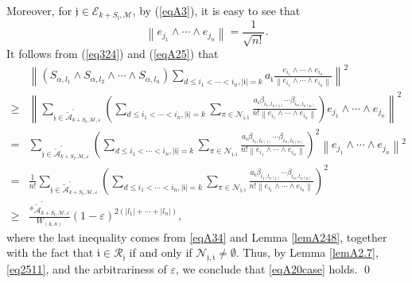 \documentclass[11pt]{article}
\theoremstyle{plain}
\theoremstyle{definition}
\begin{document}
{		Moreover, for $\mathfrak{j} \in \mathcal{E}_{k+S_{\mathfrak{l}},\mathscr{M}} $, by (\ref{eqA3}), it is easy to see that
		\begin{equation}\label{eqA25}
			\left \| e_{j_1} \wedge \cdots \wedge e_{j_n} \right \| =\frac{1}{\sqrt{n!} }.
		\end{equation}
	It follows from (\ref{eq324}) and (\ref{eqA25}) that 
		\begin{equation}\label{eq2511}  \begin{aligned}
				&	\left \| \left (S_{{\alpha,l_{1}}}\wedge S_{{\alpha,l_{2}}}\wedge \cdots \wedge S_{{\alpha,l_{n}}}  \right )
				\sum\limits_{d \leq i_1 < \cdots < i_n, |\mathfrak{i}|=k}a_{ \mathfrak{i}} \frac{ e_{i_1} \wedge \cdots \wedge e_{i_n} }{\left \|  e_{i_1} \wedge \cdots \wedge e_{i_n}  \right \| }       \right \| ^{2}
				\\\ge& \left \| \sum\limits_{\mathfrak{j}\in \tilde{\mathcal{A}}_{k+S_{\mathfrak{l}},\mathscr{M},\varepsilon }^{\prime}}
				\left ( \sum\limits_{d \leq i_1 < \cdots < i_n, |\mathfrak{i}|=k}
				\sum\limits_{\pi \in \mathcal{N}_{\mathfrak{j}, \mathfrak{i}  } } \frac{a_{ \mathfrak{i}}		\beta_{i_{1},l_{\pi  (1)}}\cdots\beta_{i_{n},l_{\pi  (n)}}}{n!\left \| e_{i_1} \wedge \cdots \wedge e_{i_n} \right \|} \right )
				e_{j_1} \wedge \cdots \wedge e_{j_n}   \right \| ^{2}
				\\= &\sum\limits_{\mathfrak{j}\in \tilde{\mathcal{A}}_{k+S_{\mathfrak{l}},\mathscr{M},\varepsilon }^{\prime}} \left( \sum\limits_{d \leq i_1 < \cdots < i_n, |\mathfrak{i}|=k}
				\sum\limits_{\pi \in \mathcal{N}_{\mathfrak{j}, \mathfrak{i}  } }\frac{a_{ \mathfrak{i}}		\beta_{i_{1},l_{\pi  (1)}} \cdots\beta_{i_{n},l_{\pi  (n)}} }{n!\left \| e_{i_1} \wedge \cdots \wedge e_{i_n} \right \|} \right ) ^{2}
				\left \| e_{j_1} \wedge \cdots \wedge e_{j_n}  \right \| ^{2}
				\\= &\frac{1}{n!}\sum\limits_{\mathfrak{j}\in \tilde{\mathcal{A}}_{k+S_{\mathfrak{l}},\mathscr{M},\varepsilon }^{\prime}}
				\left( \sum\limits_{d \leq i_1 < \cdots < i_n, |\mathfrak{i}|=k}
				\sum\limits_{\pi \in \mathcal{N}_{\mathfrak{j}, \mathfrak{i}  } }\frac{a_{ \mathfrak{i}}		\beta_{i_{1},l_{\pi  (1)}} \cdots\beta_{i_{n},l_{\pi  (n)}} }{n!\left \| e_{i_1} \wedge \cdots \wedge e_{i_n} \right \|} \right ) ^{2}\\ \ge&  \frac{^{\#  } \tilde{\mathcal{A}}_{k+S_{\mathfrak{l}},\mathscr{M},\varepsilon }^{\prime} }{W_{(k,n)} } \left ( 1 - \varepsilon \right ) ^{2\left ( \left | l_{1} \right |  + \cdots +\left | l_{n} \right | \right ) },
		\end{aligned}	\end{equation}
		where the last inequality comes from \eqref{eqA34} and Lemma \ref{lemA248}, together with the fact that $ \mathfrak{i} \in \mathcal{R}_{\mathfrak{j} }$ if and only if $\mathcal{N}_{\mathfrak{j},\mathfrak{i} }  \neq \emptyset.$
		Thus, by Lemma \ref{lemA2.7}, \eqref{eq2511}, 
		 and the arbitrariness of $\varepsilon$, we conclude that \eqref{eqA20case} holds.
\qed




}
\end{document}
